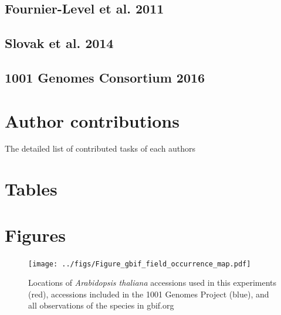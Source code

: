 \documentclass[12pt,]{article}
\begin{document}
\subsection{Fournier-Level et al.
2011}\label{fournier-level-et-al.-2011}

\subsection{Slovak et al. 2014}\label{slovak-et-al.-2014}

\subsection{1001 Genomes Consortium 2016}\label{genomes-consortium-2016}

\section{Author contributions}\label{author-contributions}

The detailed list of contributed tasks of each authors

\pagebreak

\section{Tables}\label{tables}

\section{Figures}\label{figures}

\begin{figure}
    \centerline{\texttt{[image: ../figs/Figure\_gbif\_field\_occurrence\_map.pdf]}}
    \caption{ Locations of \textit{Arabidopsis thaliana} accessions used in this experiments (red), accessions included in the 1001 Genomes Project (blue), and all observations of the species in gbif.org}
    \label{fig:ecotypes}
\end{figure}
\end{document}
